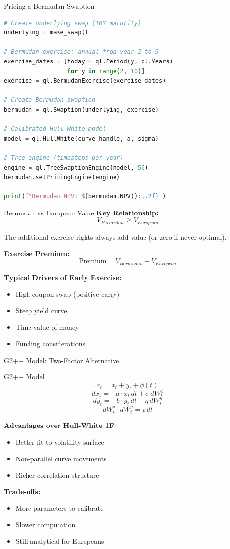 \documentclass[aspectratio=169,11pt]{beamer}
\begin{document}
\begin{frame}[fragile]{Pricing a Bermudan Swaption}
\begin{lstlisting}[language=Python]
# Create underlying swap (10Y maturity)
underlying = make_swap()

# Bermudan exercise: annual from year 2 to 9
exercise_dates = [today + ql.Period(y, ql.Years)
                  for y in range(2, 10)]
exercise = ql.BermudanExercise(exercise_dates)

# Create Bermudan swaption
bermudan = ql.Swaption(underlying, exercise)

# Calibrated Hull-White model
model = ql.HullWhite(curve_handle, a, sigma)

# Tree engine (timesteps per year)
engine = ql.TreeSwaptionEngine(model, 50)
bermudan.setPricingEngine(engine)

print(f"Bermudan NPV: ${bermudan.NPV():,.2f}")
\end{lstlisting}
\end{frame}

\begin{frame}{Bermudan vs European Value}
\textbf{Key Relationship:}
\[
V_{Bermudan} \geq V_{European}
\]

The additional exercise rights always add value (or zero if never optimal).

\vspace{0.3cm}
\textbf{Exercise Premium:}
\[
\text{Premium} = V_{Bermudan} - V_{European}
\]

\textbf{Typical Drivers of Early Exercise:}
\begin{itemize}
    \item High coupon swap (positive carry)
    \item Steep yield curve
    \item Time value of money
    \item Funding considerations
\end{itemize}
\end{frame}

\begin{frame}{G2++ Model: Two-Factor Alternative}
\begin{block}{G2++ Model}
\[
r_t = x_t + y_t + \phi(t)
\]
\[
dx_t = -a \cdot x_t\, dt + \sigma\, dW_t^x
\]
\[
dy_t = -b \cdot y_t\, dt + \eta\, dW_t^y
\]
\[
dW_t^x \cdot dW_t^y = \rho\, dt
\]
\end{block}

\textbf{Advantages over Hull-White 1F:}
\begin{itemize}
    \item Better fit to volatility surface
    \item Non-parallel curve movements
    \item Richer correlation structure
\end{itemize}

\textbf{Trade-offs:}
\begin{itemize}
    \item More parameters to calibrate
    \item Slower computation
    \item Still analytical for Europeans
\end{itemize}
\end{frame}
\end{document}
